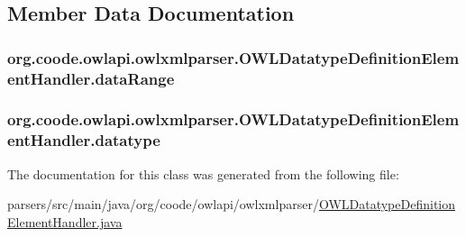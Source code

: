 \subsection{Member Data Documentation}
\hypertarget{classorg_1_1coode_1_1owlapi_1_1owlxmlparser_1_1_o_w_l_datatype_definition_element_handler_ae046a2764a22e46706493cc0221eb937}{
\subsubsection[{data\-Range}]{ org.\-coode.\-owlapi.\-owlxmlparser.\-O\-W\-L\-Datatype\-Definition\-Element\-Handler.\-data\-Range\hspace{0.3cm}{\ttfamily [private]}}}\label{classorg_1_1coode_1_1owlapi_1_1owlxmlparser_1_1_o_w_l_datatype_definition_element_handler_ae046a2764a22e46706493cc0221eb937}
\hypertarget{classorg_1_1coode_1_1owlapi_1_1owlxmlparser_1_1_o_w_l_datatype_definition_element_handler_a54d6d6c06dcd39f85e3692224afd1773}{
\subsubsection[{datatype}]{ org.\-coode.\-owlapi.\-owlxmlparser.\-O\-W\-L\-Datatype\-Definition\-Element\-Handler.\-datatype\hspace{0.3cm}{\ttfamily [private]}}}\label{classorg_1_1coode_1_1owlapi_1_1owlxmlparser_1_1_o_w_l_datatype_definition_element_handler_a54d6d6c06dcd39f85e3692224afd1773}


The documentation for this class was generated from the following file\-:\begin{DoxyCompactItemize}
\item 
parsers/src/main/java/org/coode/owlapi/owlxmlparser/\hyperlink{_o_w_l_datatype_definition_element_handler_8java}{O\-W\-L\-Datatype\-Definition\-Element\-Handler.\-java}\end{DoxyCompactItemize}
